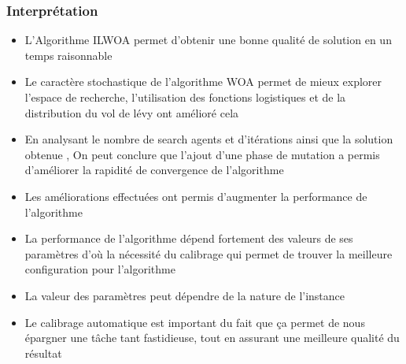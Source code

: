 \documentclass[12pt]{article}
\begin{document}
  \subsubsection{Interprétation }
  \begin{itemize}
    \item L’Algorithme ILWOA permet d’obtenir une bonne qualité de solution en un temps raisonnable   
    \item Le caractère stochastique de l’algorithme WOA permet de mieux explorer l’espace de recherche, l’utilisation des fonctions logistiques et de la distribution du vol de lévy ont amélioré cela 
    \item En analysant le nombre de search agents et d’itérations ainsi que la solution obtenue , On peut conclure que l’ajout d’une phase de mutation a permis d’améliorer la rapidité de convergence de l’algorithme 
    \item Les améliorations effectuées ont permis d’augmenter la performance de l’algorithme 
    \item La performance de l’algorithme dépend fortement des valeurs de ses paramètres d’où la nécessité du calibrage qui permet de trouver la meilleure configuration pour l’algorithme
    \item La valeur des paramètres peut dépendre de la nature de l’instance
    \item Le calibrage automatique est important du fait que ça permet de nous épargner une tâche tant  fastidieuse, tout en assurant une meilleure qualité du résultat

\end{itemize}
\end{document}

